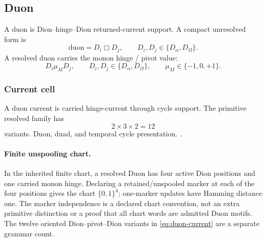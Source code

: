 \subsection{Duon}
\label{subsec:duon}
\begin{definition}
A duon is Dion--hinge--Dion returned-current support. A compact unresolved form is
\[
\mathrm{duon}=D_i\Box D_j,
\qquad D_i,D_j\in\{D_\alpha,D_\Omega\}.
\]
A resolved duon carries the monon hinge / pivot value:
\begin{equation}
D_i\mu_M D_j,
\qquad
D_i,D_j\in\{D_\alpha,D_\Omega\},
\qquad
\mu_M\in\{-1,0,+1\}.
\label{eq:duon-current}
\end{equation}
\end{definition}

\subsubsection{Current cell}
\label{subsec:duon-current-cell}
A duon current is carried hinge-current through cycle support. The primitive resolved family has
\[
2\times3\times2=12
\]
variants. Duon, duad, and temporal cycle presentation. .

\paragraph{Finite unspooling chart.}
\label{subsec:finite-q4-witness}
In the inherited finite chart, a resolved Duon has four active Dion positions
and one carried monon hinge. Declaring a retained/unspooled marker at each of
the four positions gives the chart \(\{0,1\}^4\); one-marker updates have
Hamming distance one. The marker independence is a declared chart convention,
not an extra primitive distinction or a proof that all chart words are admitted
Duon motifs. The twelve oriented Dion--pivot--Dion variants in
\eqref{eq:duon-current} are a separate grammar count.

